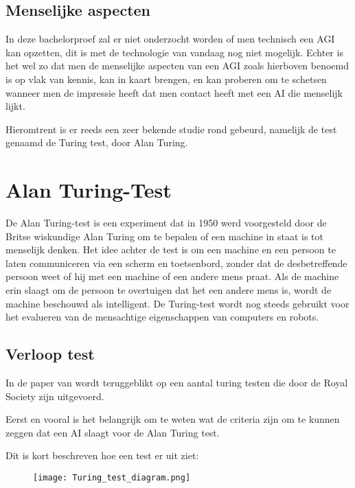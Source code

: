 \newpage

\subsection{Menselijke aspecten}

In deze bachelorproef zal er niet onderzocht worden of men technisch een AGI kan opzetten, dit is met de technologie van vandaag nog niet mogelijk. Echter is het wel zo dat men de menselijke aspecten van een AGI zoals hierboven benoemd is op vlak van kennis, kan in kaart brengen, en kan proberen om te schetsen wanneer men de impressie heeft dat men contact heeft met een AI die menselijk lijkt. 

Hieromtrent is er reeds een zeer bekende  studie rond gebeurd, namelijk de test genaamd de Turing test, door Alan Turing.

\section{Alan Turing-Test}

De Alan Turing-test is een experiment dat in 1950 werd voorgesteld door de Britse wiskundige Alan Turing om te bepalen of een machine in staat is tot menselijk denken. Het idee achter de test is om een machine en een persoon te laten communiceren via een scherm en toetsenbord, zonder dat de desbetreffende persoon weet of hij met een machine of een andere mens praat. Als de machine erin slaagt om de persoon te overtuigen dat het een andere mens is, wordt de machine beschouwd als intelligent. De Turing-test wordt nog steeds gebruikt voor het evalueren van de mensachtige eigenschappen van computers en robots.

\subsection{Verloop test}

In de paper van \cite{warwick2016can} wordt teruggeblikt op een aantal turing testen die door de Royal Society zijn uitgevoerd.

Eerst en vooral is het belangrijk om te weten wat de criteria zijn om te kunnen zeggen dat een AI slaagt voor de Alan Turing test. 

Dit is kort beschreven hoe een test er uit ziet: 

\begin{figure}[htbp]
    \centering
    \texttt{[image: Turing\_test\_diagram.png]}
    \caption{\cite{Margallo2017}}
    \label{fig:turing test diagram}
\end{figure}

